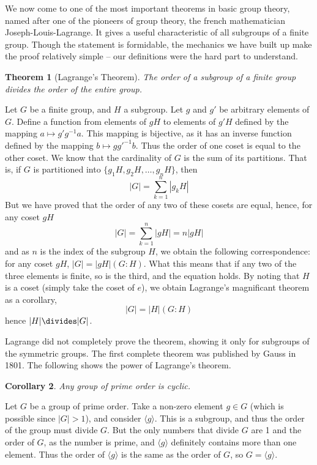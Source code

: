 \documentclass[12pt]{amsbook}
\makeatletter
\theoremstyle{plain}
\newtheorem{theorem}{Theorem}[chapter]
\newtheorem{corollary}[theorem]{Corollary}
\theoremstyle{definition}
\renewenvironment{proof}[1][\proofname]{\par
  \pushQED{\qed}%
  \normalfont \topsep6\p@\@plus6\p@\relax
  \list{}{\leftmargin=0em
          \rightmargin=\leftmargin
          \settowidth{\itemindent}{\itshape#1}%
          \labelwidth=\itemindent}

  \item[\hskip\labelsep
        \itshape
    #1\@addpunct{.}]\ignorespaces
}{%
  \popQED\endlist\@endpefalse
}
\makeatother
\begin{document}
We now come to one of the most important theorems in basic group theory, named after one of the pioneers of group theory, the french mathematician Joseph-Louis-Lagrange. It gives a useful characteristic of all subgroups of a finite group. Though the statement is formidable, the mechanics we have built up make the proof relatively simple -- our definitions were the hard part to understand.

\begin{theorem}[Lagrange's Theorem] 
    The order of a subgroup of a finite group divides the order of the entire group.
\end{theorem}
\begin{proof}
Let $G$ be a finite group, and $H$ a subgroup. Let $g$ and $g'$ be arbitrary elements of $G$. Define a function from elements of $gH$ to elements of $g'H$ defined by the mapping $a \mapsto g'g^{-1}a$. This mapping is bijective, as it has an inverse function defined by the mapping $b \mapsto gg'^{-1}b$. Thus the order of one coset is equal to the other coset. We know that the cardinality of $G$ is the sum of its partitions. That is, if $G$ is partitioned into $\{ g_1H, g_2H, \dots, g_nH \}$, then
%
\[ |G| = \sum_{k = 1}^n |g_kH| \]
%
But we have proved that the order of any two of these cosets are equal, hence, for any coset $gH$
%
\[ |G| = \sum_{k = 1}^n |gH| = n|gH| \]
%
and as $n$ is the index of the subgroup $H$, we obtain the following correspondence: for any coset $gH$, $|G| = |gH|(G:H)$. What this means that if any two of the three elements is finite, so is the third, and the equation holds. By noting that $H$ is a coset (simply take the coset of $e$), we obtain Lagrange's magnificant theorem as a corollary,
%
\[ |G| = |H|(G:H) \]
%
hence $|H| \divides |G|$.
\end{proof}

Lagrange did not completely prove the theorem, showing it only for subgroups of the symmetric groups. The first complete theorem was published by Gauss in 1801. The following shows the power of Lagrange's theorem.

\begin{corollary} Any group of prime order is cyclic. \end{corollary}
\begin{proof}
    Let $G$ be a group of prime order. Take a non-zero element $g \in G$ (which is possible since $|G| > 1$), and consider $\langle g \rangle$. This is a subgroup, and thus the order of the group must divide $G$. But the only numbers that divide $G$ are 1 and the order of $G$, as the number is prime, and $\langle g \rangle$ definitely contains more than one element. Thus the order of $\langle g \rangle$ is the same as the order of $G$, so $G = \langle g \rangle$.
\end{proof}
\end{document}
